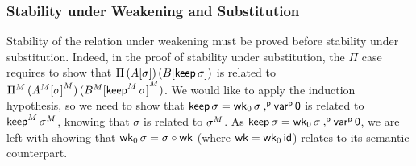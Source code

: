\subsubsection{Stability under Weakening and Substitution}



  Stability of the relation under
  weakening must be proved before stability under substitution.
  Indeed, in the proof of stability under substitution, the $\Pi$ case
  requires to show that $\Pi \,(A[\sigma]) \,(B[\mathsf{keep}\,\sigma])$ is related to
  ${\Pi}^M\,({A}^M{[\sigma]}^M)\,
  ({B}^M{[{\mathsf{keep}}^M\,\sigma]}^M)$.
  We would like to apply the induction hypothesis, so we need to show that
  $\mathsf{keep}\,\sigma=\mathsf{wk}_0\,\sigma\mathbin{{,}^{\mathsf{p}}} {\mathsf{var}}^{\mathsf{p}}\,\mathsf{0}$ is related to
  ${\mathsf{keep}}^M\,{\sigma}^M$, knowing that $\sigma$ is
  related to ${\sigma}^M$.
  As $\mathsf{keep}\,\sigma=\mathsf{wk}_0\,\sigma\mathbin{{,}^{\mathsf{p}}} {\mathsf{var}}^{\mathsf{p}}\, \mathsf{0}$, we are left with showing that
  $\mathsf{wk}_0\,\sigma=\sigma\circ\mathsf{wk}$ (where $\mathsf{wk}=\mathsf{wk}_0\,\mathsf{id}$)
  relates to its semantic counterpart.





